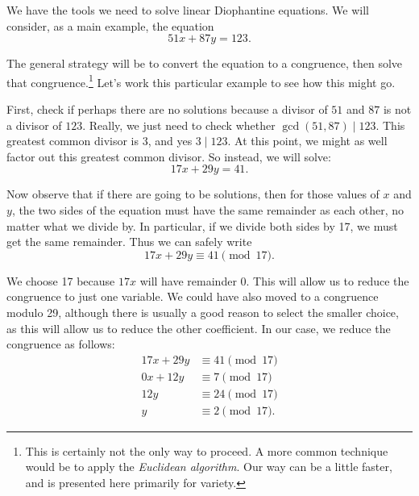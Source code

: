 \documentclass[10pt,]{book}
\theoremstyle{plain}
\theoremstyle{definition}
\theoremstyle{definition}
\theoremstyle{definition}
\numberwithin{equation}{chapter}
\newcommand{\amp}{ & }
\begin{document}
We have the tools we need to solve linear Diophantine equations. We will consider, as a main example, the equation
\begin{equation*}
  51x + 87y = 123.
\end{equation*}
%
\par

The general strategy will be to convert the equation to a congruence, then solve that congruence.\footnote{This is certainly not the only way to proceed.  A more common technique would be to apply the \emph{Euclidean algorithm}.  Our way can be a little faster, and is presented here primarily for variety.\label{fn-23}} Let's work this particular example to see how this might go.
%
\par

First, check if perhaps there are no solutions because a divisor of \(51\) and \(87\) is not a divisor of \(123\). Really, we just need to check whether \(\gcd(51, 87) \mid 123\). This greatest common divisor is 3, and yes \(3 \mid 123\). At this point, we might as well factor out this greatest common divisor. So instead, we will solve:
\begin{equation*}
  17x + 29y = 41.
\end{equation*}
%
\par

Now observe that if there are going to be solutions, then for those values of \(x\) and \(y\), the two sides of the equation must have the same remainder as each other, no matter what we divide by. In particular, if we divide both sides by 17, we must get the same remainder. Thus we can safely write
\begin{equation*}
  17x + 29y \equiv 41 \pmod{17}.
\end{equation*}
%
\par

We choose 17 because \(17x\) will have remainder 0. This will allow us to reduce the congruence to just one variable. We could have also moved to a congruence modulo 29, although there is usually a good reason to select the smaller choice, as this will allow us to reduce the other coefficient. In our case, we reduce the congruence as follows:
\begin{equation*}
  \begin{aligned}17x + 29y \amp  \equiv 41 \pmod{17} \\
0x + 12y \amp  \equiv 7 \pmod{17} \\
12 y \amp  \equiv 24 \pmod{17} \\
y \amp  \equiv 2 \pmod{17}.
\end{aligned}
\end{equation*}
%
\par
\end{document}
